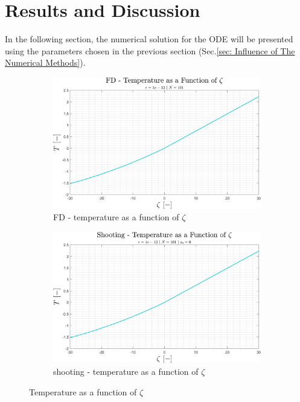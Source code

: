 \documentclass[11pt, a4paper]{article}
\begin{document}
\newpage
\section{Results and Discussion}
In the following section, the numerical solution for the ODE will be presented using the parameters chosen in the previous section (Sec.\ref{sec: Influence of The Numerical Methods}).
\begin{figure}[H]
    \centering
    \begin{subfigure}[c]{0.49\textwidth}
        \centering
        \includegraphics[width=\textwidth]{images/FD - T vs zeta.png}
        \caption{FD - temperature as a function of $\zeta$}
        \label{fig: FD - T vs zeta}
    \end{subfigure}
    \hfill
    \begin{subfigure}[c]{0.49\textwidth}
        \centering
        \includegraphics[width=\textwidth]{images/shooting - T vs zeta.png}
        \caption{shooting - temperature as a function of $\zeta$}
        \label{fig: shooting - T vs zeta}
    \end{subfigure}
    \caption{Temperature as a function of $\zeta$}
    \label{fig: T vs zeta}
\end{figure}
\end{document}
